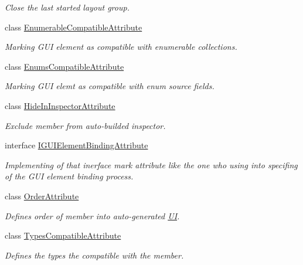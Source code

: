 \begin{DoxyCompactItemize}
\begin{DoxyCompactList}\small\item\em Close the last started layout group. \end{DoxyCompactList}\item 
class \mbox{\hyperlink{class_wpf_handler_1_1_u_i_1_1_auto_layout_1_1_configuration_1_1_enumerable_compatible_attribute}{Enumerable\+Compatible\+Attribute}}
\begin{DoxyCompactList}\small\item\em Marking G\+UI element as compatible with enumerable collections. \end{DoxyCompactList}\item 
class \mbox{\hyperlink{class_wpf_handler_1_1_u_i_1_1_auto_layout_1_1_configuration_1_1_enums_compatible_attribute}{Enums\+Compatible\+Attribute}}
\begin{DoxyCompactList}\small\item\em Marking G\+UI elemt as compatible with enum source fields. \end{DoxyCompactList}\item 
class \mbox{\hyperlink{class_wpf_handler_1_1_u_i_1_1_auto_layout_1_1_configuration_1_1_hide_in_inspector_attribute}{Hide\+In\+Inspector\+Attribute}}
\begin{DoxyCompactList}\small\item\em Exclude member from auto-\/builded inspector. \end{DoxyCompactList}\item 
interface \mbox{\hyperlink{interface_wpf_handler_1_1_u_i_1_1_auto_layout_1_1_configuration_1_1_i_g_u_i_element_binding_attribute}{I\+G\+U\+I\+Element\+Binding\+Attribute}}
\begin{DoxyCompactList}\small\item\em Implementing of that inerface mark attribute like the one who using into specifing of the G\+UI element binding process. \end{DoxyCompactList}\item 
class \mbox{\hyperlink{class_wpf_handler_1_1_u_i_1_1_auto_layout_1_1_configuration_1_1_order_attribute}{Order\+Attribute}}
\begin{DoxyCompactList}\small\item\em Defines order of member into auto-\/generated \mbox{\hyperlink{namespace_wpf_handler_1_1_u_i}{UI}}. \end{DoxyCompactList}\item 
class \mbox{\hyperlink{class_wpf_handler_1_1_u_i_1_1_auto_layout_1_1_configuration_1_1_types_compatible_attribute}{Types\+Compatible\+Attribute}}
\begin{DoxyCompactList}\small\item\em Defines the types the compatible with the member. \end{DoxyCompactList}\end{DoxyCompactItemize}
